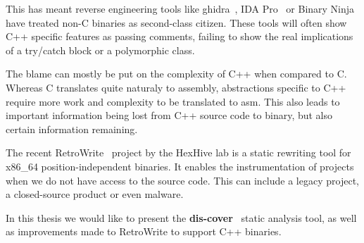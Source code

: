 \documentclass[a4paper,11pt,oneside]{report}
\begin{document}

This has meant reverse engineering tools like ghidra~\cite{ghidra}, IDA Pro~\cite{ida} or Binary Ninja~\cite{binja} have treated non-C binaries as second-class citizen.
These tools will often show C++ specific features as passing comments, failing to show the real implications of a try/catch block or a polymorphic class.


The blame can mostly be put on the complexity of C++ when compared to C.
Whereas C translates quite naturaly to assembly, abstractions specific to C++ require more work and complexity to be translated to asm.
This also leads to important information being lost from C++ source code to binary, but also certain information remaining.



The recent RetroWrite~\cite{dinesh20oakland} project by the HexHive lab is a static rewriting tool for x86\_64 position-independent binaries.
It enables the instrumentation of projects when we do not have access to the source code.
This can include a legacy project, a closed-source product or even malware.




In this thesis we would like to present the \textbf{dis-cover}~\cite{discovergithub} static analysis tool,
as well as improvements made to RetroWrite to support C++ binaries.


\end{document}
